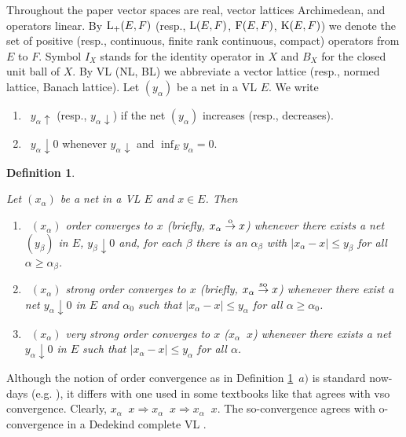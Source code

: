 \documentclass[10pt]{article}
\newtheorem{definition}[theorem]{Definition}
\DeclareMathOperator{\convo}{\xrightarrow[]{o}}
\DeclareMathOperator{\convso}{\xrightarrow[]{so}}
\DeclareMathOperator{\convvso}{\xrightarrow[]{vso}}
\begin{document}
{{{Throughout the paper vector spaces are real, vector lattices Archimedean,
and operators linear. By $\text{\rm L}_+(E,F)$ (resp., $\text{\rm L}(E,F)$, $\text{\rm F}(E,F)$, $\text{\rm K}(E,F)$) we denote the set of 
positive (resp., continuous, finite rank continuous, compact) operators from $E$ to $F$.
Symbol $I_X$ stands for the identity operator in $X$ and $B_X$ for the closed unit ball of $X$.
By VL (NL, BL) we abbreviate a vector lattice (resp., normed lattice, Banach lattice).
Let $(y_\alpha)$ be a net in a VL $E$. We write 
\begin{enumerate}[-]
\item\
$y_\alpha\uparrow$ (resp., $y_\alpha\downarrow$) if the net $(y_\alpha)$ increases 
(resp., decreases).
\item\
$y_\alpha\downarrow 0$ whenever $y_\alpha\downarrow$ and $\inf_E y_\alpha=0$.
\end{enumerate}

\begin{definition}\label{order convergence} 
{\em
Let $(x_\alpha)$ be a net in a VL $E$ and $x\in E$. Then
\begin{enumerate}[$a)$]
\item\ 
$(x_\alpha)$ order converges to $x$ (briefly, $x_\alpha\stackrel{\text{\rm o}}{\to} x$) 
whenever there exists a net $(y_\beta)$ in $E$, $y_\beta\downarrow 0$ and, for each $\beta$ 
there is an $\alpha_\beta$ with $|x_\alpha-x|\le y_\beta$ for all $\alpha\ge\alpha_\beta$. 
\item\ 
$(x_\alpha)$ strong order converges to $x$ (briefly, $x_\alpha\stackrel{\text{\rm so}}{\to} x$) 
whenever there exist a net $y_\alpha\downarrow 0$ in $E$ and $\alpha_0$ such that $|x_\alpha-x|\le y_\alpha$ for all $\alpha\ge\alpha_0$.
\item\ 
$(x_\alpha)$ very strong order converges to $x$ ($x_\alpha\convvso x$) 
whenever there exists a net $y_\alpha\downarrow 0$ in $E$ such that $|x_\alpha-x|\le y_\alpha$ for all $\alpha$.
\end{enumerate}
}
\end{definition}
\noindent
Although the notion of order convergence as in Definition \ref{order convergence}~$a)$ is standard now-days (e.g. \cite{EGK2019}), it differs with one 
used in some textbooks like \cite{AB2006,Mey1991} that agrees with vso convergence. 
Clearly, $x_\alpha\convvso x\Longrightarrow x_\alpha\convso x\Longrightarrow x_\alpha\convo x$.
The so-conver\-gence agrees with o-convergence in a Dedekind complete VL \cite[Proposition 1.5]{AS2005}.  

}}}
\end{document}
